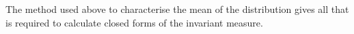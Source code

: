         The method used above to characterise the mean of the distribution gives all that is required to calculate closed forms of the invariant measure.
    
